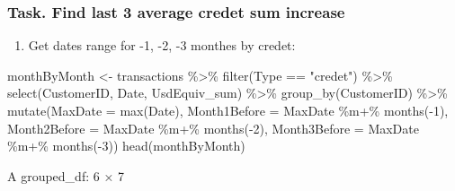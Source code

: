 \documentclass[
  letterpaper,
  DIV=11,
  numbers=noendperiod]{scrreprt}
\newenvironment{Shaded}{\begin{snugshade}}{\end{snugshade}}
\newcommand{\AttributeTok}[1]{\textcolor[rgb]{0.40,0.45,0.13}{#1}}
\newcommand{\DecValTok}[1]{\textcolor[rgb]{0.68,0.00,0.00}{#1}}
\newcommand{\FunctionTok}[1]{\textcolor[rgb]{0.28,0.35,0.67}{#1}}
\newcommand{\NormalTok}[1]{\textcolor[rgb]{0.00,0.23,0.31}{#1}}
\newcommand{\OtherTok}[1]{\textcolor[rgb]{0.00,0.23,0.31}{#1}}
\newcommand{\SpecialCharTok}[1]{\textcolor[rgb]{0.37,0.37,0.37}{#1}}
\newcommand{\StringTok}[1]{\textcolor[rgb]{0.13,0.47,0.30}{#1}}
\providecommand{\tightlist}{%
  \setlength{\itemsep}{0pt}\setlength{\parskip}{0pt}}\usepackage{longtable,booktabs,array}
\begin{document}
\subsubsection{Task. Find last 3 average credet sum
increase}\label{task.-find-last-3-average-credet-sum-increase}

\begin{enumerate}
\def\labelenumi{\arabic{enumi}.}
\tightlist
\item
  Get dates range for -1, -2, -3 monthes by credet:
\end{enumerate}

\begin{Shaded}
\begin{Highlighting}[]
\NormalTok{monthByMonth }\OtherTok{\textless{}{-}}\NormalTok{ transactions }\SpecialCharTok{\%\textgreater{}\%}
        \FunctionTok{filter}\NormalTok{(Type }\SpecialCharTok{==} \StringTok{"credet"}\NormalTok{) }\SpecialCharTok{\%\textgreater{}\%}
        \FunctionTok{select}\NormalTok{(CustomerID, Date, UsdEquiv\_sum) }\SpecialCharTok{\%\textgreater{}\%}
        \FunctionTok{group\_by}\NormalTok{(CustomerID) }\SpecialCharTok{\%\textgreater{}\%}
        \FunctionTok{mutate}\NormalTok{(}\AttributeTok{MaxDate =} \FunctionTok{max}\NormalTok{(Date),}
               \AttributeTok{Month1Before =}\NormalTok{ MaxDate }\SpecialCharTok{\%m+\%} \FunctionTok{months}\NormalTok{(}\SpecialCharTok{{-}}\DecValTok{1}\NormalTok{),}
               \AttributeTok{Month2Before =}\NormalTok{ MaxDate }\SpecialCharTok{\%m+\%} \FunctionTok{months}\NormalTok{(}\SpecialCharTok{{-}}\DecValTok{2}\NormalTok{),}
               \AttributeTok{Month3Before =}\NormalTok{ MaxDate }\SpecialCharTok{\%m+\%} \FunctionTok{months}\NormalTok{(}\SpecialCharTok{{-}}\DecValTok{3}\NormalTok{)) }
\FunctionTok{head}\NormalTok{(monthByMonth)}
\end{Highlighting}
\end{Shaded}

A grouped\_df: 6 × 7
\end{document}
